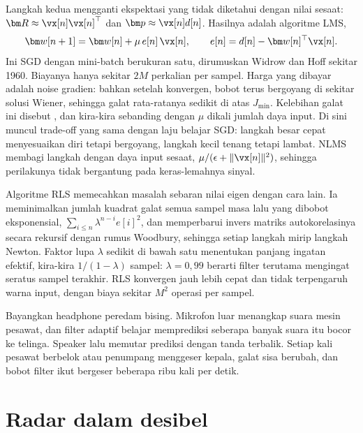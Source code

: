 Langkah kedua mengganti ekspektasi yang tidak diketahui dengan nilai sesaat: $\bm R\approx\vx[n]\vx[n]^\top$
dan $\bm p\approx\vx[n]d[n]$. Hasilnya adalah algoritme LMS,
\begin{equation}
\bm w[n+1]=\bm w[n]+\mu\,e[n]\,\vx[n],\qquad e[n]=d[n]-\bm w[n]^\top\vx[n].
\end{equation}
Ini SGD dengan mini-batch berukuran satu, dirumuskan Widrow dan Hoff sekitar 1960. Biayanya hanya
sekitar $2M$ perkalian per sampel. Harga yang dibayar adalah noise gradien: bahkan setelah konvergen,
bobot terus bergoyang di sekitar solusi Wiener, sehingga galat rata-ratanya sedikit di atas $J_{\min}$.
Kelebihan galat ini disebut , dan kira-kira sebanding dengan $\mu$ dikali jumlah daya
input. Di sini muncul trade-off yang sama dengan laju belajar SGD: langkah besar cepat menyesuaikan diri
tetapi bergoyang, langkah kecil tenang tetapi lambat. NLMS membagi langkah dengan daya input sesaat,
$\mu/(\epsilon+\|\vx[n]\|^2)$, sehingga perilakunya tidak bergantung pada keras-lemahnya sinyal.

Algoritme RLS memecahkan masalah sebaran nilai eigen dengan cara lain. Ia meminimalkan jumlah kuadrat galat
semua sampel masa lalu yang dibobot eksponensial, $\sum_{i\le n}\lambda^{n-i}e[i]^2$, dan memperbarui invers
matriks autokorelasinya secara rekursif dengan rumus Woodbury, sehingga setiap langkah mirip langkah Newton.
Faktor lupa $\lambda$ sedikit di bawah satu menentukan panjang ingatan efektif, kira-kira $1/(1-\lambda)$
sampel: $\lambda=0{,}99$ berarti filter terutama mengingat seratus sampel terakhir. RLS konvergen jauh lebih
cepat dan tidak terpengaruh warna input, dengan biaya sekitar $M^2$ operasi per sampel.

Bayangkan headphone peredam bising. Mikrofon luar menangkap suara mesin pesawat, dan filter adaptif belajar
memprediksi seberapa banyak suara itu bocor ke telinga. Speaker lalu memutar prediksi dengan tanda terbalik.
Setiap kali pesawat berbelok atau penumpang menggeser kepala, galat sisa berubah, dan bobot filter ikut
bergeser beberapa ribu kali per detik.

\section{Radar dalam desibel}

